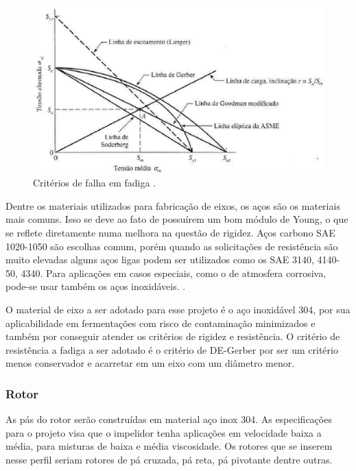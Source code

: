\begin{figure}[h]
	\centering
	\includegraphics[keepaspectratio=true,scale=0.5]{figuras/eixo.eps}
	\caption{Critérios de falha em fadiga \cite{shigley2005projeto}.}
	\label{eixo}
\end{figure}

Dentre os materiais utilizados para fabricação de eixos, os aços são os materiais mais comuns. Isso se deve ao fato de possuírem um bom módulo de Young, o que se reflete diretamente numa melhora na questão de rigidez. Aços carbono SAE 1020-1050 são escolhas comum, porém quando as solicitações de resistência são muito elevadas alguns aços ligas podem ser utilizados como os SAE 3140, 4140-50, 4340. \cite{shigley2005projeto} Para aplicações em casos especiais, como o de atmosfera corrosiva, pode-se usar também os aços inoxidáveis.  \cite{norton2013projeto}.

O material de eixo a ser adotado para esse projeto é o aço inoxidável 304, por sua aplicabilidade em fermentações com risco de contaminação minimizados e também por conseguir atender os critérios de rigidez e resistência. O critério de resistência a fadiga a ser adotado é o critério de DE-Gerber por ser um critério menos conservador e acarretar em um eixo com um diâmetro menor.

\subsubsection{Rotor}

As pás do rotor serão construídas em material aço inox 304. As especificações para o projeto visa que o impelidor tenha aplicações em velocidade baixa a média, para misturas de baixa e média viscosidade. Os rotores que se inserem nesse perfil seriam rotores de pá cruzada, pá reta, pá pivotante dentre outras.

